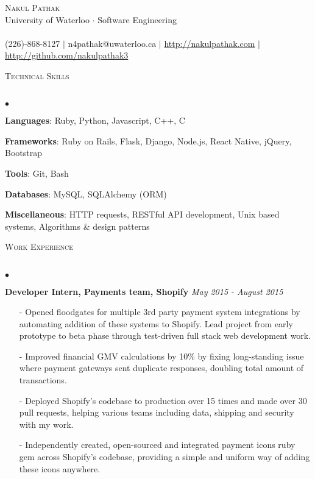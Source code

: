 \documentclass[10pt]{article}
\newcommand{\lineunder}{\vspace*{-8pt} \\ \hspace*{-18pt} \hrulefill \\}
\newcommand{\header}[1]{{\hspace*{-15pt}\vspace*{6pt} \textsc{#1}} \vspace*{-6pt} \lineunder}
\newenvironment{achievements}{\begin{list}{$\bullet$}{\topsep 0pt \itemsep -1.5pt \leftmargin 5pt}}{\vspace*{4pt}\end{list}}
\begin{document}
\small
\smallskip
\vspace*{-45pt}

\begin{center}
	{\Huge \scshape {Nakul Pathak}} \\
	\vspace*{6pt} 
{\fontsize{10}{1}\selectfont University of Waterloo $\cdot$ Software Engineering} \\
\vspace{-4pt}
\hspace*{-18pt} \hrulefill \\
\vspace{2pt}
\hspace*{-18pt} (226)-868-8127 $|$ n4pathak@uwaterloo.ca $|$ \url{http://nakulpathak.com} $|$  \url{http://github.com/nakulpathak3}
\vspace{-5pt}
\end{center}

\vspace{7pt}

\header{\normalsize Technical Skills}
\begin{achievements}
\item \textbf{Languages}: Ruby, Python, Javascript, C++, C
\item \textbf{Frameworks}: Ruby on Rails, Flask, Django, Node.js, React Native, jQuery, Bootstrap
\item \textbf{Tools}: Git, Bash
\item \textbf{Databases}: MySQL,  SQLAlchemy (ORM)
\item \textbf{Miscellaneous}: HTTP requests, RESTful API development, Unix based systems, Algorithms \& design patterns
\end{achievements}

\vspace{6pt}

\header{\normalsize Work Experience}
\begin{achievements}
\item \textbf{Developer Intern, Payments team, Shopify} \hfill \textit {May 2015 - August 2015}
\begin{itemize}[leftmargin=0cm]
\item[-]Opened floodgates for multiple 3rd party payment system integrations by automating addition of these systems to Shopify. Lead project from early prototype to beta phase through test-driven full stack web development work.
\item[-]Improved financial GMV calculations by 10\% by fixing long-standing issue where payment gateways sent duplicate responses, doubling total amount of transactions. 
\item[-]Deployed Shopify's codebase to production over 15 times and made over 30 pull requests, helping various teams including data, shipping and security with my work.
\item[-]Independently created, open-sourced and integrated payment icons ruby gem across Shopify's codebase, providing a simple and uniform way of adding these icons anywhere.
\end{itemize}
\end{achievements}
\end{document}
